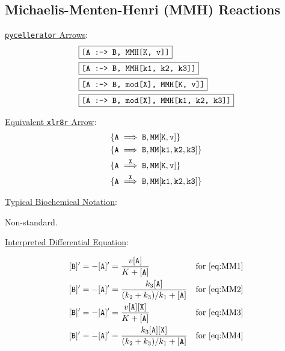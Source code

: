 \subsection{Michaelis-Menten-Henri (MMH) Reactions }
\label{subsection:MMH}
\underline{{\tt pycellerator} Arrows}:
\begin{align}
&\boxed{\text {\tt [A :-> B, MMH[K, v]]}}\label{eq:MM1}\\
&\boxed{\text {\tt [A :-> B, MMH[k1, k2, k3]]}}\label{eq:MM2}\\
&\boxed{\text {\tt [A :-> B, mod[X], MMH[K, v]]}} \label{eq:MM3}\\
&\boxed{\text {\tt [A :-> B, mod[X], MMH[k1, k2, k3]]}}\label{eq:MM4}
\end{align}

\underline{Equivalent {\tt xlr8r} Arrow}: 
\begin{align*}
\{ {\tt A} &\implies {\tt B, MM[K,v]}\} \\
\{ {\tt A} &\implies {\tt B, MM[k1, k2, k3]}\} \\
\{ {\tt A} &\overset{\tt X}{\implies} {\tt B, MM[K,v]}\}\\
\{ {\tt A} &\overset{\tt X}{\implies} {\tt B, MM[k1, k2, k3]}\}
\end{align*}


\underline{Typical Biochemical Notation}: 

Non-standard. 

\underline{Interpreted Differential Equation}:

\begin{align*}
{\tt[B]'} &= -{\tt[A]'} = \dfrac{v{\tt[A]}}{K+{\tt[A]}} &\text{for \ref{eq:MM1}}\\
{\tt[B]'} &= -{\tt[A]'} = \dfrac{k_3 {\tt[A]}}{(k_2+k_3)/k_1+{\tt[A]}} &\text{for \ref{eq:MM2}}\\
{\tt[B]'} &= -{\tt[A]'} = \dfrac{v{\tt[A][X]}}{K+{\tt[A]}} &\text{for \ref{eq:MM3}}\\
{\tt[B]'} &= -{\tt[A]'} = \dfrac{k_3{\tt[A][X]}}{(k_2+k_3)/k_1+{\tt[A]}} &\text{for \ref{eq:MM4}}
\end{align*}

